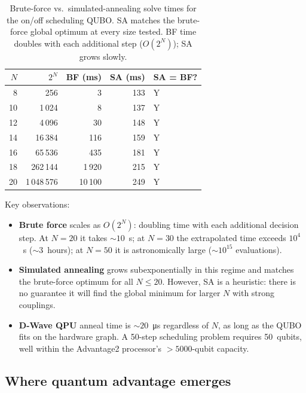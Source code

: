 \documentclass[8pt,a4paper]{article}
\theoremstyle{definition}
\theoremstyle{remark}
\begin{document}
\begin{table}[h]
\centering
\begin{tabular}{rrrrl}
  \toprule
  $N$ & $2^N$ & BF (ms) & SA (ms) & SA = BF? \\
  \midrule
   8 &       256 &      3 &    133 & Y \\
  10 &     1\,024 &      8 &    137 & Y \\
  12 &     4\,096 &     30 &    148 & Y \\
  14 &    16\,384 &    116 &    159 & Y \\
  16 &    65\,536 &    435 &    181 & Y \\
  18 &   262\,144 &  1\,920 &    215 & Y \\
  20 & 1\,048\,576 & 10\,100 &    249 & Y \\
  \bottomrule
\end{tabular}
\caption{Brute-force vs.\ simulated-annealing solve times for
  the on/off scheduling QUBO.  SA matches the brute-force global
  optimum at every size tested.  BF time doubles with each additional
  step ($O(2^N)$); SA grows slowly.}
\label{tab:scheduling-scaling}
\end{table}

Key observations:
\begin{itemize}[leftmargin=1.5em, itemsep=2pt]
  \item \textbf{Brute force} scales as $O(2^N)$: doubling time with
    each additional decision step.  At $N=20$ it takes $\sim 10$~s;
    at $N=30$ the extrapolated time exceeds $10^4$~s ($\sim 3$~hours);
    at $N=50$ it is astronomically large ($\sim 10^{15}$ evaluations).
  \item \textbf{Simulated annealing} grows subexponentially in this
    regime and matches the brute-force optimum for all $N \le 20$.
    However, SA is a heuristic: there is no guarantee it will find the
    global minimum for larger $N$ with strong couplings.
  \item \textbf{D-Wave QPU} anneal time is $\sim 20$~\si{\micro\second}
    regardless of $N$, as long as the QUBO fits on the hardware graph.
    A 50-step scheduling problem requires 50~qubits, well within the
    Advantage2 processor's $>5000$-qubit capacity.
\end{itemize}

\subsection{Where quantum advantage emerges}
\end{document}
